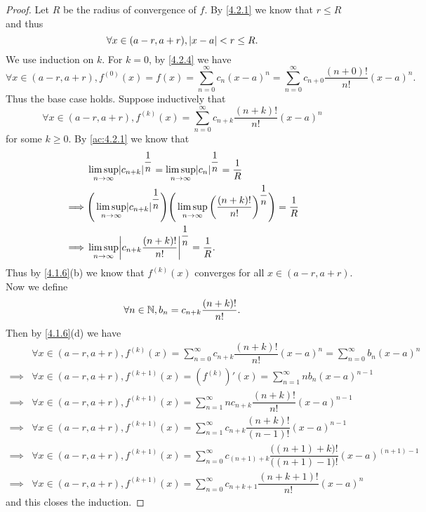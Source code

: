\begin{proof}
  Let \(R\) be the radius of convergence of \(f\).
  By \cref{4.2.1} we know that \(r \leq R\) and thus
  \[
    \forall x \in (a - r, a + r), \left\lvert x - a\right\rvert < r \leq R.
  \]
  We use induction on \(k\).
  For \(k = 0\), by \cref{4.2.4} we have
  \[
    \forall x \in (a - r, a + r), f^{(0)}(x) = f(x) = \sum_{n = 0}^\infty c_n (x - a)^n = \sum_{n = 0}^\infty c_{n + 0} \dfrac{(n + 0)!}{n!} (x - a)^n.
  \]
  Thus the base case holds.
  Suppose inductively that
  \[
    \forall x \in (a - r, a + r), f^{(k)}(x) = \sum_{n = 0}^\infty c_{n + k} \dfrac{(n + k)!}{n!} (x - a)^n
  \]
  for some \(k \geq 0\).
  By \cref{ac:4.2.1} we know that
  \begin{align*}
             & \limsup_{n \to \infty} \abs{c_{n + k}}^{\dfrac{1}{n}} = \limsup_{n \to \infty} \abs{c_n}^{\dfrac{1}{n}} = \dfrac{1}{R}                                              \\
    \implies & \Bigg(\limsup_{n \to \infty} \abs{c_{n + k}}^{\dfrac{1}{n}}\Bigg) \Bigg(\limsup_{n \to \infty} \bigg(\dfrac{(n + k)!}{n!}\bigg)^{\dfrac{1}{n}}\Bigg) = \dfrac{1}{R} \\
    \implies & \limsup_{n \to \infty} \abs{c_{n + k} \dfrac{(n + k)!}{n!}}^{\dfrac{1}{n}} = \dfrac{1}{R}.
  \end{align*}
  Thus by \cref{4.1.6}(b) we know that \(f^{(k)}(x)\) converges for all \(x \in (a - r, a + r)\).
  Now we define
  \[
    \forall n \in \mathbb{N}, b_n = c_{n + k} \dfrac{(n + k)!}{n!}.
  \]
  Then by \cref{4.1.6}(d) we have
  \begin{align*}
             & \forall x \in (a - r, a + r), f^{(k)}(x) = \sum_{n = 0}^\infty c_{n + k} \dfrac{(n + k)!}{n!} (x - a)^n = \sum_{n = 0}^\infty b_n (x - a)^n                     \\
    \implies & \forall x \in (a - r, a + r), f^{(k + 1)}(x) = (f^{(k)})'(x) = \sum_{n = 1}^\infty n b_n (x - a)^{n - 1}                                                        \\
    \implies & \forall x \in (a - r, a + r), f^{(k + 1)}(x) = \sum_{n = 1}^\infty n c_{n + k} \dfrac{(n + k)!}{n!} (x - a)^{n - 1}                                             \\
    \implies & \forall x \in (a - r, a + r), f^{(k + 1)}(x) = \sum_{n = 1}^\infty c_{n + k} \dfrac{(n + k)!}{(n - 1)!} (x - a)^{n - 1}                                         \\
    \implies & \forall x \in (a - r, a + r), f^{(k + 1)}(x) = \sum_{n = 0}^\infty c_{(n + 1) + k} \dfrac{\big((n + 1) + k\big)!}{\big((n + 1) - 1\big)!} (x - a)^{(n + 1) - 1} \\
    \implies & \forall x \in (a - r, a + r), f^{(k + 1)}(x) = \sum_{n = 0}^\infty c_{n + k + 1} \dfrac{(n + k + 1)!}{n!} (x - a)^n
  \end{align*}
  and this closes the induction.
\end{proof}

